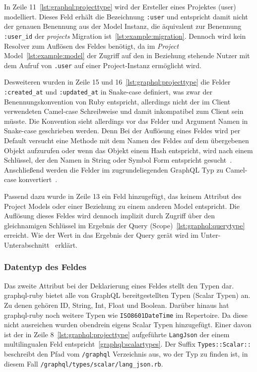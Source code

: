 In Zeile 11~\ref{lst:graphql:projecttype} wird der Ersteller eines Projektes (user) modelliert. Dieses Feld erhält die Bezeichnung \lstinline|:user| und entspricht damit nicht der genauen Benennung aus der Model Instanz, die äquivalent zur Benennung \lstinline|:user_id| der \emph{projects} Migration ist~\ref{lst:example:migration}. Dennoch wird kein Resolver zum Auflösen des Feldes benötigt, da im \emph{Project} Model~\ref{lst:example:model} der Zugriff auf den in Beziehung stehende Nutzer mit dem Aufruf von \lstinline|.user| auf einer Project-Instanz ermöglicht wird. 

Desweiteren wurden in Zeile 15 und 16~\ref{lst:graphql:projecttype} die Felder \lstinline|:created_at| und \lstinline|:updated_at| in Snake-case definiert, was zwar der Benennungskonvention von Ruby entspricht, allerdings nicht der im Client verwendeten Camel-case Schreibweise und damit inkompatibel zum Client sein müsste. Die Konvention sieht allerdings vor das Felder und Argument Namen in Snake-case geschrieben werden. Denn Bei der Auflösung eines Feldes wird per Default versucht eine Methode mit dem Namen des Feldes auf dem übergebenen Objekt aufzurufen oder wenn das Objekt einem Hash entspricht, wird nach einem Schlüssel, der den Namen in String oder Symbol Form entspricht gesucht~\cite{graphql-field-resolution}. Anschließend werden die Felder im zugrundeliegenden GraphQL Typ zu Camel-case konvertiert~\cite{graphql-object-classes}.

Passend dazu wurde in Zeile 13 ein Feld hinzugefügt, das keinem Attribut des Project Models oder einer Beziehung zu einem anderen Model entspricht. Die Auflösung dieses Feldes wird dennoch implizit durch Zugriff über den gleichnamigen Schlüssel im Ergebnis der Query (Scope)~\ref{lst:graphql:querytype} erreicht. Wie der Wert in das Ergebnis der Query gerät wird im Unter-Unterabschnitt~ erklärt.

\subsubsection{Datentyp des Feldes}
Das zweite Attribut bei der Deklarierung eines Feldes stellt den Typen dar. graphql-ruby bietet alle von GraphQL bereitgestellten Typen (Scalar Typen) an. Zu denen gehören ID, String, Int, Float und Boolean. Darüber hinaus hat graphql-ruby noch weitere Typen wie \lstinline|ISO8601DateTime| im Repertoire. Da diese nicht ausreichen wurden obendrein eigens Scalar Typen hinzugefügt. Einer davon ist der in Zeile 8~\ref{lst:graphql:projecttype} aufgeführte \lstinline|LangJson| der einem multilingualen Feld entspricht~\ref{graphql:scalartypes}. Der Suffix \lstinline|Types::Scalar::| beschreibt den Pfad vom \lstinline|/graphql| Verzeichnis aus, wo der Typ zu finden ist, in diesem Fall \lstinline|/graphql/types/scalar/lang_json.rb|.

